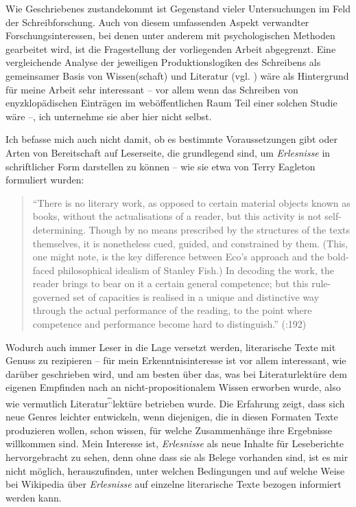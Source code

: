 \documentclass[fontsize=12pt]{scrartcl}
\begin{document}
Wie Geschriebenes zustandekommt ist Gegenstand vieler Untersuchungen im Feld der Schreibfor\-schung. Auch von diesem umfassenden Aspekt verwandter For\-schungs\-inte\-res\-sen, bei denen unter anderem mit psychologischen Methoden gearbeitet wird, ist die Fragestellung der vorliegenden Arbeit abgegrenzt. Eine vergleichende Ana\-lyse der jeweiligen Produktionslogiken des Schrei\-bens als gemeinsamer Basis von Wissen(schaft) und Li\-te\-ra\-tur (vgl. \cite{Kammer2013}) w\"are als Hintergrund f\"ur meine Arbeit sehr interessant -- vor allem wenn das Schrei\-ben von enyzklop\"adischen Eintr\"agen im web\"of\-fent\-lichen Raum Teil einer solchen Studie w\"are --, ich unternehme sie aber \mbox{hier} nicht \mbox{selbst}.

Ich befasse mich auch nicht damit, ob es bestimmte Voraussetzungen gibt oder Arten von Bereitschaft auf Leser\textsuperscript{\tiny *}seite, die grundlegend sind, um \textit{Erlesnisse} in schriftlicher Form dar\-stel\-len zu k\"onnen -- wie sie etwa von Terry Eagleton formuliert wurden:

\singlespacing
\begin{quote}
"`There is no literary work, as opposed to certain material objects known as books, without the \flq actualisations\frq \,\,of a reader, but this activity is not self-determining. Though by no means prescribed by the structures of the texts themselves, it is nonetheless cued, guided, and constrained by them. (This, one might note, is the key difference between Eco's approach and the bold-faced philosophical idealism of Stanley Fish.) In decoding the work, the reader brings to bear on it a certain general competence; but this rule-governed set of capacities is realised in a unique and distinctive way through the actual performance of the reading, to the point where competence and performance become hard to distinguish."' (\cite{Eagleton2012}:192)
\end{quote}
\onehalfspacing

Wodurch auch immer Leser\textsuperscript{\tiny *} in die Lage versetzt werden, li\-te\-ra\-rische Texte mit Genuss zu rezipieren -- f\"ur mein Erkenntnisinteresse ist vor allem interessant, wie dar\"uber geschrieben wird, und am besten \"uber das, was bei Li\-te\-ra\-tur\-lekt\"ure dem eigenen Empfinden nach an nicht-pro\-po\-si\-ti\-o\-na\-lem Wissen erworben wurde, also wie vermutlich Li\-te\-ra\-tur\textsuperscript{\~.\~.}lekt\"ure betrieben wurde. Die Erfah\-rung zeigt, dass sich neue Genres leichter entwickeln, wenn diejenigen, die in diesen Formaten Texte produzieren wollen, schon wissen, f\"ur welche Zusammenh\"ange ihre Ergebnisse willkommen sind. Mein Interesse ist, \textit{Erlesnisse} als neue Inhalte f\"ur Leseberichte hervorgebracht zu sehen, denn ohne dass sie als Belege vorhanden sind, ist es mir nicht m\"oglich, he\-rauszufinden, unter welchen Bedingungen und auf welche Weise bei Wi\-ki\-pe\-dia \"uber \textit{Erlesnisse} auf einzelne li\-te\-ra\-rische Texte bezogen informiert werden kann.
\end{document}
